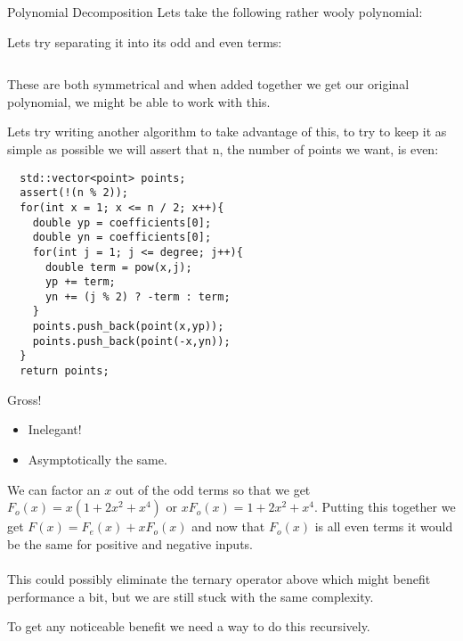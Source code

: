 \documentclass{beamer}
\begin{document}
\begin{frame}{Polynomial Decomposition}
  Lets take the following rather wooly polynomial:
\end{frame}

\begin{frame}
  Lets try separating it into its odd and even terms:

  \begin{columns}
  \end{columns}

  These are both symmetrical and when added together we get our original polynomial, we might be able to work with this.

\end{frame}

\begin{frame}[fragile]

  Lets try writing another algorithm to take advantage of this, to try to keep it as simple as possible we will assert that n, the number of points we want, is even:

  \begin{lstlisting}
  std::vector<point> points;
  assert(!(n % 2));
  for(int x = 1; x <= n / 2; x++){
    double yp = coefficients[0];
    double yn = coefficients[0];
    for(int j = 1; j <= degree; j++){
      double term = pow(x,j);
      yp += term;
      yn += (j % 2) ? -term : term;
    }
    points.push_back(point(x,yp));
    points.push_back(point(-x,yn));
  }
  return points;
\end{lstlisting}
\end{frame}

\begin{frame}
  Gross!
  \begin{itemize}
    \item Inelegant!
    \item Asymptotically the same.
  \end{itemize}

  We can factor an $x$ out of the odd terms so that we get $F_o(x)=x(1+2x^2+x^4)$ or $x F_o(x)=1+2x^2+x^4$. Putting this together we get $F(x) = F_e(x) + xF_o(x)$ and now that $F_o(x)$ is all even terms it would be the same for positive and negative inputs.\\~\\
  This could possibly eliminate the ternary operator above which might benefit performance a bit, but we are still stuck with the same complexity.

  To get any noticeable benefit we need a way to do this recursively.
\end{frame}
\end{document}
